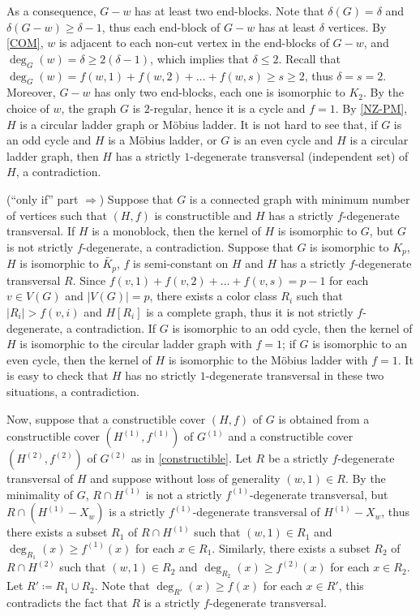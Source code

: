 \documentclass{article}
\makeatletter
\renewenvironment{proof}[1][\proofname]{\par
  \pushQED{\qed}%
  \normalfont \topsep6\p@\@plus6\p@\relax
  \trivlist
  \item[\hskip\labelsep
        \bfseries
    #1\@addpunct{.}]\ignorespaces
}{%
  \popQED\endtrivlist\@endpefalse
}
\theoremstyle{definition}
\makeatother
\begin{document}
\begin{proof}[Proof of \autoref{MR}]
As a consequence, $G - w$ has at least two end-blocks. Note that $\delta(G) = \delta$ and $\delta(G - w) \geq \delta - 1$, thus each end-block of $G - w$ has at least $\delta$ vertices. By \autoref{COM}, $w$ is adjacent to each non-cut vertex in the end-blocks of $G - w$, and $\deg_{G}(w) = \delta \geq 2(\delta -1)$, which implies that $\delta \leq 2$. Recall that $\deg_{G}(w) = f(w, 1) + f(w, 2) + \dots + f(w, s) \geq s \geq 2$, thus $\delta = s = 2$. Moreover, $G - w$ has only two end-blocks, each one is isomorphic to $K_{2}$. By the choice of $w$, the graph $G$ is $2$-regular, hence it is a cycle and $f = 1$. By \autoref{NZ-PM}, $H$ is a circular ladder graph or M\"{o}bius ladder. It is not hard to see that, if $G$ is an odd cycle and $H$ is a M\"{o}bius ladder, or $G$ is an even cycle and $H$ is a circular ladder graph, then $H$ has a strictly $1$-degenerate transversal (independent set) of $H$, a contradiction. 

\medskip
(``only if'' part $\Longrightarrow$) Suppose that $G$ is a connected graph with minimum number of vertices such that $(H, f)$ is constructible and $H$ has a strictly $f$-degenerate transversal. If $H$ is a monoblock, then the kernel of $H$ is isomorphic to $G$, but $G$ is not strictly $f$-degenerate, a contradiction. Suppose that $G$ is isomorphic to $K_{p}$, $H$ is isomorphic to $\widetilde{K_{p}}$, $f$ is semi-constant on $H$ and $H$ has a strictly $f$-degenerate transversal $R$. Since $f(v, 1) + f(v, 2) + \dots + f(v, s) = p - 1$ for each $v \in V(G)$ and $|V(G)| = p$, there exists a color class $R_{i}$ such that $|R_{i}| > f(v, i)$ and $H[R_{i}]$ is a complete graph, thus it is not strictly $f$-degenerate, a contradiction. If $G$ is isomorphic to an odd cycle, then the kernel of $H$ is isomorphic to the circular ladder graph with $f = 1$; if $G$ is isomorphic to an even cycle, then the kernel of $H$ is isomorphic to the M\"{o}bius ladder with $f = 1$. It is easy to check that $H$ has no strictly $1$-degenerate transversal in these two situations, a contradiction. 

Now, suppose that a constructible cover $(H, f)$ of $G$ is obtained from a constructible cover $(H^{(1)}, f^{(1)})$ of $G^{(1)}$ and a constructible cover $(H^{(2)}, f^{(2)})$ of $G^{(2)}$ as in \autoref{constructible}. Let $R$ be a strictly $f$-degenerate transversal of $H$ and suppose without loss of generality $(w, 1) \in R$. By the minimality of $G$, $R \cap H^{(1)}$ is not a strictly $f^{(1)}$-degenerate transversal, but $R \cap (H^{(1)} - X_{w})$ is a strictly $f^{(1)}$-degenerate transversal of $H^{(1)} - X_{w}$, thus there exists a subset $R_{1}$ of $R \cap H^{(1)}$ such that $(w, 1) \in R_{1}$ and $\deg_{R_{1}}(x) \geq f^{(1)}(x)$ for each $x \in R_{1}$. Similarly, there exists a subset $R_{2}$ of $R \cap H^{(2)}$ such that $(w, 1) \in R_{2}$ and $\deg_{R_{2}}(x) \geq f^{(2)}(x)$ for each $x \in R_{2}$. Let $R' \coloneqq R_{1} \cup R_{2}$. Note that $\deg_{R'}(x) \geq f(x)$ for each $x \in R'$, this contradicts the fact that $R$ is a strictly $f$-degenerate transversal. 
\end{proof}
\end{document}
